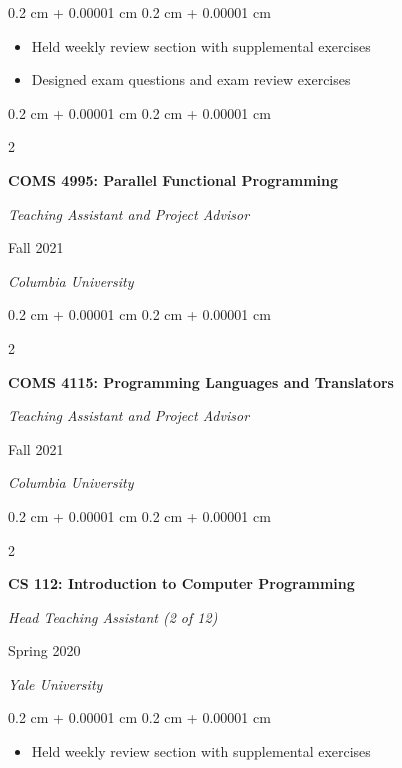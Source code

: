 \documentclass[10pt, letterpaper]{article}
\newenvironment{highlights}{
    \begin{itemize}[
        topsep=0.05 cm,
        parsep=0.05 cm,
        partopsep=0pt,
        itemsep=0pt,
        leftmargin=0.4 cm + 10pt
    ]
}{
    \end{itemize}
} %
\newenvironment{onecolentry}{
    \begin{adjustwidth}{
        0.2 cm + 0.00001 cm
    }{
        0.2 cm + 0.00001 cm
    }
}{
    \end{adjustwidth}
} %
\newenvironment{twocolentry}[2][]{
    \onecolentry
    \def\secondColumn{#2}
    \setcolumnwidth{\fill, 5.5 cm}
    \begin{paracol}{2}
}{
    \switchcolumn \raggedleft \secondColumn
    \end{paracol}
    \endonecolentry
} %
\begin{document}
        \vspace{0.10 cm}
        \begin{onecolentry}
            \begin{highlights}
                \item Held weekly review section with supplemental exercises
                \item Designed exam questions and exam review exercises
            \end{highlights}
        \end{onecolentry}

        \vspace{0.4 cm}

        \begin{twocolentry}{Fall 2021
            
            \textit{Columbia University}}
            \textbf{COMS 4995: Parallel Functional Programming}
            
            \textit{Teaching Assistant and Project Advisor}
        \end{twocolentry}

        \vspace{0.4 cm}

        \begin{twocolentry}{Fall 2021
            
            \textit{Columbia University}}
            \textbf{COMS 4115: Programming Languages and Translators}
            
            \textit{Teaching Assistant and Project Advisor}
        \end{twocolentry}

        \vspace{0.4 cm}

        \begin{twocolentry}{Spring 2020
            
            \textit{Yale University}}
            \textbf{CS 112: Introduction to Computer Programming}
            
            \textit{Head Teaching Assistant (2 of 12)}
        \end{twocolentry}

        \vspace{0.10 cm}
        \begin{onecolentry}
            \begin{highlights}
                \item Held weekly review section with supplemental exercises
            \end{highlights}
        \end{onecolentry}
\end{document}
